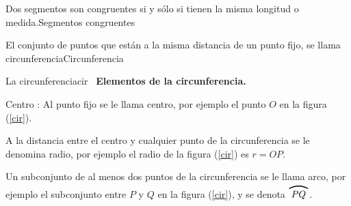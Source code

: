 \begin{definicion}{Dos segmentos son congruentes si y sólo si tienen la misma
longitud o medida.}{Segmentos congruentes}
\end{definicion}
\begin{definicion}{El conjunto de puntos que est\'{a}n a la misma distancia de un punto fijo,
se llama circunferencia}{Circunferencia}
 \begin{figura}{
}{La circunferencia}{cir}
\nota \, \textbf{Elementos de la circunferencia. }
\begin{lista}
\item Centro : Al punto fijo se le llama centro, por ejemplo el punto $O$ en la figura (\ref{cir}).

\item A la distancia entre el centro y  cualquier punto de la
circunferencia se le denomina radio, por ejemplo el radio de la figura (\ref{cir}) es $r=OP$.

\item Un subconjunto de al menos dos puntos de la circunferencia se le llama
arco, por ejemplo el subconjunto entre $P$ y $Q$ en la figura (\ref{cir}), y se denota $\arco[20pt]{PQ}$.
\end{lista}
   \end{figura}
\end{definicion}
